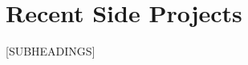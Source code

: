 \section{Recent Side Projects}
\resumeSubHeadingList

[SUBHEADINGS]

\resumeSubHeadingListEnd
\grayborder